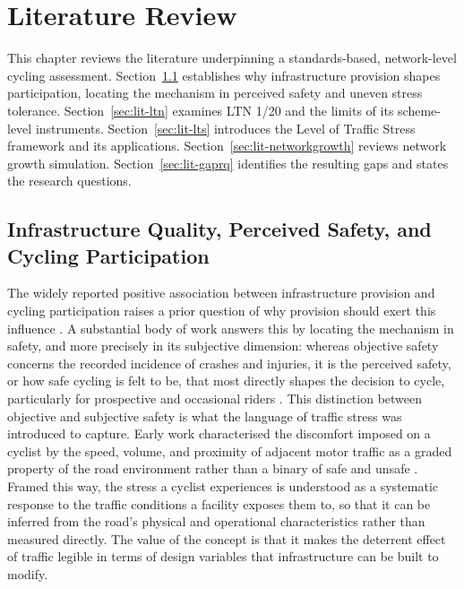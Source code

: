 \chapter{Literature Review}
\label{ch:literature}

This chapter reviews the literature underpinning a standards-based, network-level cycling assessment. Section~\ref{sec:lit-background} establishes why infrastructure provision shapes participation, locating the mechanism in perceived safety and uneven stress tolerance. Section~\ref{sec:lit-ltn} examines LTN 1/20 and the limits of its scheme-level instruments. Section~\ref{sec:lit-lts} introduces the Level of Traffic Stress framework and its applications. Section~\ref{sec:lit-networkgrowth} reviews network growth simulation. Section~\ref{sec:lit-gaprq} identifies the resulting gaps and states the research questions.

\section{Infrastructure Quality, Perceived Safety, and Cycling Participation}
\label{sec:lit-background}

The widely reported positive association between infrastructure provision and cycling participation raises a prior question of why provision should exert this influence \parencite{hull2014,pistoll2014,buehler2016,molenberg2019}. A substantial body of work answers this by locating the mechanism in safety, and more precisely in its subjective dimension: whereas objective safety concerns the recorded incidence of crashes and injuries, it is the perceived safety, or how safe cycling is felt to be, that most directly shapes the decision to cycle, particularly for prospective and occasional riders \parencite{chaurand2013,sanders2015,manton2016}. This distinction between objective and subjective safety is what the language of traffic stress was introduced to capture. Early work characterised the discomfort imposed on a cyclist by the speed, volume, and proximity of adjacent motor traffic as a graded property of the road environment rather than a binary of safe and unsafe \parencite{sorton1994,landis1997,harkey1998}. Framed this way, the stress a cyclist experiences is understood as a systematic response to the traffic conditions a facility exposes them to, so that it can be inferred from the road's physical and operational characteristics rather than measured directly. The value of the concept is that it makes the deterrent effect of traffic legible in terms of design variables that infrastructure can be built to modify.

